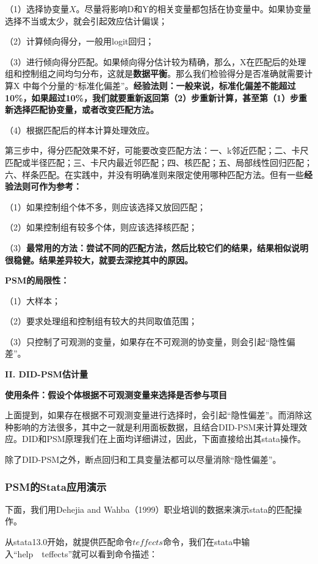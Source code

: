 \documentclass[cn,10pt,math=newtx,citestyle=gb7714-2015,bibstyle=gb7714-2015]{elegantbook}
\begin{document}
	（1）选择协变量$X$。尽量将影响D和Y的相关变量都包括在协变量中。如果协变量选择不当或太少，就会引起效应估计偏误；
	
	（2）计算倾向得分，一般用logit回归；
	
	（3）进行倾向得分匹配。如果倾向得分估计较为精确，那么，X在匹配后的处理组和控制组之间均匀分布，这就是\textbf{数据平衡}。那么我们检验得分是否准确就需要计算X 中每个分量的“标准化偏差”。\textbf{经验法则：一般来说，标准化偏差不能超过10\%，如果超过10\%，我们就要重新返回第（2）步重新计算，甚至第（1）步重新选择匹配协变量，或者改变匹配方法。}
	
	（4）根据匹配后的样本计算处理效应。
	
	第三步中，得分匹配效果不好，可能要改变匹配方法：一、k邻近匹配；二、卡尺匹配或半径匹配；三、卡尺内最近邻匹配；四、核匹配；五、局部线性回归匹配；六、样条匹配。在实践中，并没有明确准则来限定使用哪种匹配方法。但有一些\textbf{经验法则可作为参考：}
	
	（1）如果控制组个体不多，则应该选择又放回匹配；
	
	（2）如果控制组有较多个体，则应该选择核匹配；
	
	（3）\textbf{最常用的方法：尝试不同的匹配方法，然后比较它们的结果，结果相似说明很稳健。结果差异较大，就要去深挖其中的原因。}
	
	\textbf{PSM的局限性：}
	
	（1）大样本；
	
	（2）要求处理组和控制组有较大的共同取值范围；
	
	（3）只控制了可观测的变量，如果存在不可观测的协变量，则会引起“隐性偏差”。
	
	
	
	\textbf{II. DID-PSM估计量}
	
	\textbf{使用条件：假设个体根据不可观测变量来选择是否参与项目}
	
	上面提到，如果存在根据不可观测变量进行选择时，会引起“隐性偏差”。而消除这种影响的方法很多，其中之一就是利用面板数据，且结合DID-PSM来计算处理效应。DID和PSM原理我们在上面均详细讲过，因此，下面直接给出其stata操作。
	
	除了DID-PSM之外，断点回归和工具变量法都可以尽量消除“隐性偏差”。
	
	\subsubsection{PSM的Stata应用演示}
	
	下面，我们用Dehejia and Wahba（1999）职业培训的数据来演示stata的匹配操作。
	
	从stata13.0开始，就提供匹配命令$teffects$命令，我们在stata中输入“help~~teffects”就可以看到命令描述：
	
\end{document}
